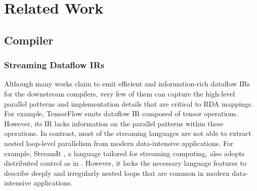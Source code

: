 \chapter{Related Work} \label{sec:related}

\section{Compiler}
\subsection{Streaming Dataflow IRs}
Although many works claim to emit efficient and information-rich dataflow IRs for the downstream compilers, 
very few of them can capture the high-level parallel patterns and implementation details that are critical 
to RDA mappings. 
For example, TensorFlow \cite{tensorflow} emits dataflow IR composed of tensor operations. 
However, its IR lacks information on the parallel patterns within these operations. 
In contrast, most of 
the streaming languages \cite{streamit, synaid, maxj} are not able to extract nested loop-level parallelism 
from modern data-intensive applications. 
For example, StreamIt \cite{streamit}, a language tailored for streaming computing, also adopts distributed 
control as in \name{}. 
However, it lacks the necessary language features to describe deeply and irregularly nested loops that are 
common in modern data-intensive applications.



